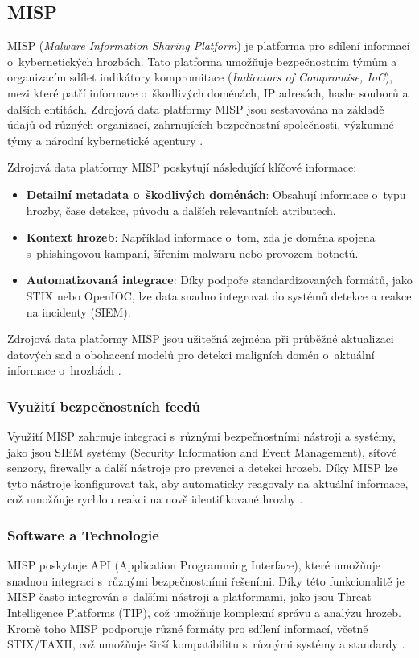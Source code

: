 \subsection{MISP}
MISP (\emph{Malware Information Sharing Platform}) je platforma pro sdílení informací o~kybernetických hrozbách. Tato platforma umožňuje bezpečnostním týmům a organizacím sdílet indikátory kompromitace (\emph{Indicators of Compromise, IoC}), mezi které patří informace o~škodlivých doménách, IP adresách, hashe souborů a dalších entitách. Zdrojová data platformy MISP jsou sestavována na základě údajů od různých organizací, zahrnujících bezpečnostní společnosti, výzkumné týmy a národní kybernetické agentury \cite{wagner2016misp}.

\noindent Zdrojová data platformy MISP poskytují následující klíčové informace:
\begin{itemize}
    \item \textbf{Detailní metadata o~škodlivých doménách}: Obsahují informace o~typu hrozby, čase detekce, původu a dalších relevantních atributech.
    \item \textbf{Kontext hrozeb}: Například informace o~tom, zda je doména spojena s~phishingovou kampaní, šířením malwaru nebo provozem botnetů.
    \item \textbf{Automatizovaná integrace}: Díky podpoře standardizovaných formátů, jako STIX nebo OpenIOC, lze data snadno integrovat do systémů detekce a reakce na incidenty (SIEM).
\end{itemize}

\noindent Zdrojová data platformy MISP jsou užitečná zejména při průběžné aktualizaci datových sad a obohacení modelů pro detekci maligních domén o~aktuální informace o~hrozbách \cite{alexander2019misp}. 


\subsubsection{Využití bezpečnostních feedů}
Využití MISP zahrnuje integraci s~různými bezpečnostními nástroji a systémy, jako jsou SIEM systémy (Security Information and Event Management), síťové senzory, firewally a další nástroje pro prevenci a detekci hrozeb. Díky MISP lze tyto nástroje konfigurovat tak, aby automaticky reagovaly na aktuální informace, což umožňuje rychlou reakci na nově identifikované hrozby \cite{wagner2016misp}.

\subsubsection{Software a Technologie}
MISP poskytuje API (Application Programming Interface), které umožňuje snadnou integraci s~různými bezpečnostními řešeními. Díky této funkcionalitě je MISP často integrován s~dalšími nástroji a platformami, jako jsou Threat Intelligence Platforms (TIP), což umožňuje komplexní správu a analýzu hrozeb. Kromě toho MISP podporuje různé formáty pro sdílení informací, včetně STIX/TAXII, což umožňuje širší kompatibilitu s~různými systémy a standardy \cite{misp2020platform}.

